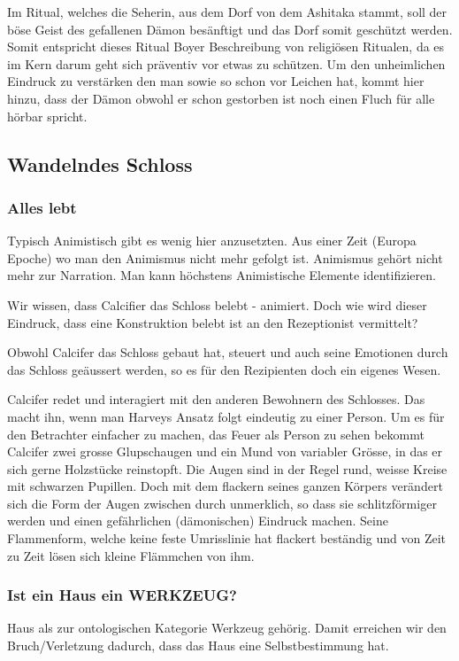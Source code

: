Im Ritual, welches die Seherin, aus dem Dorf von dem Ashitaka stammt, soll der böse Geist des gefallenen Dämon besänftigt und das Dorf somit geschützt werden. Somit entspricht dieses Ritual Boyer Beschreibung von religiösen Ritualen, da es im Kern darum geht sich präventiv vor etwas zu schützen. Um den unheimlichen Eindruck zu verstärken den man sowie so schon vor Leichen hat, kommt hier hinzu, dass der Dämon obwohl er schon gestorben ist noch einen Fluch für alle hörbar spricht.


\subsection{Wandelndes Schloss}
\subsubsection{Alles lebt}
Typisch Animistisch gibt es wenig hier anzusetzten. Aus einer Zeit (Europa Epoche) wo man den Animismus nicht mehr gefolgt ist. Animismus gehört nicht mehr zur Narration. Man kann höchstens Animistische Elemente identifizieren. 

Wir wissen, dass Calcifier das Schloss belebt - animiert. Doch wie wird dieser Eindruck, dass eine Konstruktion belebt ist an den Rezeptionist vermittelt?

Obwohl Calcifer das Schloss gebaut hat, steuert und auch seine Emotionen durch das Schloss geäussert werden, so es für den Rezipienten doch ein eigenes Wesen.


Calcifer redet und interagiert mit den anderen Bewohnern des Schlosses. Das macht ihn, wenn man Harveys Ansatz folgt eindeutig zu einer Person. Um es für den Betrachter einfacher zu machen, das Feuer als Person zu sehen bekommt Calcifer zwei grosse Glupschaugen und ein Mund von variabler Grösse, in das er sich gerne Holzstücke reinstopft. Die Augen sind in der Regel rund, weisse Kreise mit schwarzen Pupillen. Doch mit dem flackern seines ganzen Körpers verändert sich die Form der Augen zwischen durch unmerklich, so dass sie schlitzförmiger werden und einen gefährlichen (dämonischen) Eindruck machen. Seine Flammenform, welche keine feste Umrisslinie hat flackert beständig und von Zeit zu Zeit lösen sich kleine Flämmchen von ihm.

\subsubsection{Ist ein Haus ein WERKZEUG?}
Haus als zur ontologischen Kategorie Werkzeug gehörig. Damit erreichen wir den Bruch/Verletzung dadurch, dass das Haus eine Selbstbestimmung hat.

